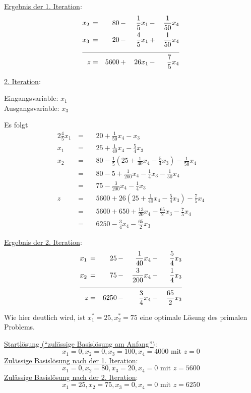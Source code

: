 \documentclass[10pt,a4paper,oneside,ngerman,numbers=noenddot]{scrartcl}
\begin{document}
			\underline{Ergebnis der 1. Iteration}:
			\begin{alignat*}{4}
				x_{2} \,&=&\, 80 \,&-&\, \frac{1}{5}x_{1} \,&-&\, \frac{1}{50}x_{4} \\
				x_{3} \,&=&\, 20 \,&-&\, \frac{4}{5}x_{1} \,&+&\, \frac{1}{50}x_{4} \\ \cline{1 - 7}
				z &=& 5600 \,&+&\, 26x_{1} \,&-&\, \frac{7}{5}x_{4}
			\end{alignat*}
			
			\underline{2. Iteration}:
		
			Eingangsvariable: $x_{1}$\\
			Ausgangsvariable: $x_{3}$
		
			Es folgt
			\begin{alignat*}{2}
				\frac{4}{5}x_{1} \,&=&&\, 20 +  \frac{1}{50}x_{4} - x_{3} \\
				x_{1} \,&=&&\, 25 + \frac{1}{40}x_{4} - \frac{5}{4}x_{3} \\
				x_{2} \,&=&&\, 80 - \frac{1}{5}\left(25 + \frac{1}{40}x_{4} - \frac{5}{4}x_{3}\right) - \frac{1}{50}x_{4} \\
				&=&&\, 80 - 5 + \frac{1}{200}x_{4} - \frac{1}{4}x_{3} - \frac{1}{50}x_{4} \\
				&=&&\, 75 - \frac{3}{200}x_{4} - \frac{1}{4}x_{3} \\
				z \,&=&&\, 5600 + 26\left(25 + \frac{1}{40}x_{4} - \frac{5}{4}x_{3}\right) - \frac{7}{5}x_{4} \\
				&=&&\, 5600 + 650 + \frac{13}{20}x_{4} - \frac{65}{2}x_{3} - \frac{7}{5}x_{4} \\
				&=&&\, 6250 - \frac{3}{4}x_{4} - \frac{65}{2}x_{3}
			\end{alignat*}
		
			\underline{Ergebnis der 2. Iteration}:
			\begin{alignat*}{4}
				x_{1} \,&=&\, 25 \,&-&\, \frac{1}{40}x_{4} \,&-&\, \frac{5}{4}x_{3} \\
				x_{2} \,&=&\, 75 \,&-&\, \frac{3}{200}x_{4} \,&-&\, \frac{1}{4}x_{3} \\ \cline{1 - 7}
				z &=& 6250 \,&-&\, \frac{3}{4}x_{4} \,&-&\, \frac{65}{2}x_{3}
			\end{alignat*}
			
			Wie hier deutlich wird, ist $x_{1}^{*} = 25, x_{2}^{*} = 75$ eine optimale Lösung des primalen Problems.
			
			\underline{Startlösung ("`zulässige Basislösung am Anfang"')}:
			\[
				x_{1} = 0, x_{2} = 0, x_{3} = 100, x_{4} = 4000 \text{ mit } z = 0
			\]
			\underline{Zulässige Basislösung nach der 1. Iteration}:
			\[
				x_{1} = 0, x_{2} = 80, x_{3} = 20, x_{4} = 0 \text{ mit } z = 5600
			\]
			\underline{Zulässige Basislösung nach der 2. Iteration}:
			\[
				x_{1} = 25, x_{2} = 75, x_{3} = 0, x_{4} = 0 \text{ mit } z = 6250
			\]
			
\end{document}
